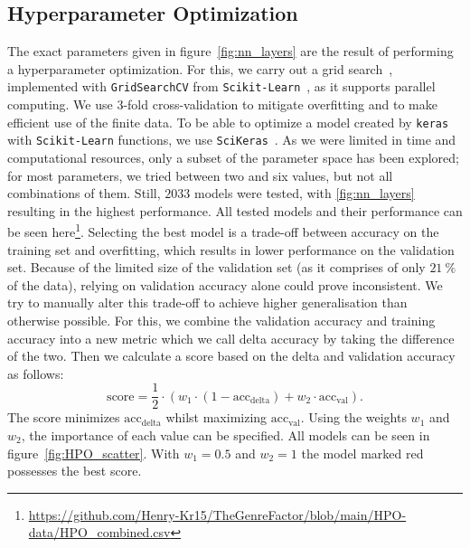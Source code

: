 \documentclass[
  12pt,
  bibliography=totoc,     %
  captions=tableheading,  %
  titlepage=firstiscover, %
]{scrartcl}
\begin{document}
\subsection{Hyperparameter Optimization}
The exact parameters given in figure~\ref{fig:nn_layers} are the result of performing a hyperparameter optimization. For this, we carry out a
grid search~\cite{gridsearch}, implemented with \texttt{GridSearchCV} from \texttt{Scikit-Learn}~\cite{scikit-learn}, as it supports parallel computing.
We use $3$-fold cross-validation  to mitigate overfitting and to make efficient use of the finite data.
To be able to optimize a model created by \texttt{keras} with \texttt{Scikit-Learn} functions, we use \texttt{SciKeras}~\cite{scikeras}. As we were limited in time and
computational resources, only a subset of the parameter space has been explored; for most parameters, we tried between two and six values, but
not all combinations of them. Still, $2033$ models were tested, with \ref{fig:nn_layers} resulting in the highest performance. All tested models and their performance can be
seen here\footnote{\url{https://github.com/Henry-Kr15/TheGenreFactor/blob/main/HPO-data/HPO_combined.csv}}.
Selecting the best model is a trade-off between accuracy on the training set and overfitting, which results in lower performance on the validation set. Because of the limited
size of the validation set (as it comprises of only $\SI{21}{\percent}$ of the data), relying on validation accuracy alone could prove inconsistent. We try to manually alter
this trade-off to achieve higher generalisation than otherwise possible. For this, we combine the validation accuracy and training accuracy into a new metric which we call
delta accuracy by taking the difference of the two. Then we calculate a score based on the delta and validation accuracy as follows:
\begin{equation}
	\text{score} = \frac{1}{2} \cdot (w_{1} \cdot (1 - \text{acc}_{\text{delta}}) + w_{2} \cdot \text{acc}_{\text{val}}).
  \label{eqn:score}
\end{equation}
The score minimizes $\text{acc}_{\text{delta}}$ whilst maximizing $\text{acc}_{\text{val}}$. Using the weights $w_{1}$ and $w_{2}$, the importance of each value can be specified.
All models can be seen in figure~\ref{fig:HPO_scatter}. With $w_{1}=0.5$ and $w_{2}=1$ the model marked red possesses the best score.
\end{document}
